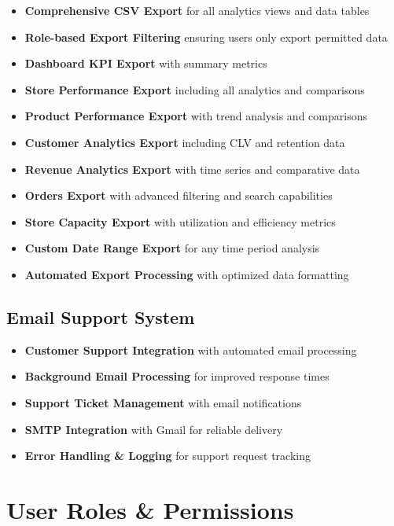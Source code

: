 \documentclass[11pt,a4paper]{article}
\begin{document}
\begin{itemize}[leftmargin=*]
    \item \textbf{Comprehensive CSV Export} for all analytics views and data tables
    \item \textbf{Role-based Export Filtering} ensuring users only export permitted data
    \item \textbf{Dashboard KPI Export} with summary metrics
    \item \textbf{Store Performance Export} including all analytics and comparisons
    \item \textbf{Product Performance Export} with trend analysis and comparisons
    \item \textbf{Customer Analytics Export} including CLV and retention data
    \item \textbf{Revenue Analytics Export} with time series and comparative data
    \item \textbf{Orders Export} with advanced filtering and search capabilities
    \item \textbf{Store Capacity Export} with utilization and efficiency metrics
    \item \textbf{Custom Date Range Export} for any time period analysis
    \item \textbf{Automated Export Processing} with optimized data formatting
\end{itemize}

\subsection{Email Support System}

\begin{itemize}[leftmargin=*]
    \item \textbf{Customer Support Integration} with automated email processing
    \item \textbf{Background Email Processing} for improved response times
    \item \textbf{Support Ticket Management} with email notifications
    \item \textbf{SMTP Integration} with Gmail for reliable delivery
    \item \textbf{Error Handling \& Logging} for support request tracking
\end{itemize}

\section{User Roles \& Permissions}
\end{document}
